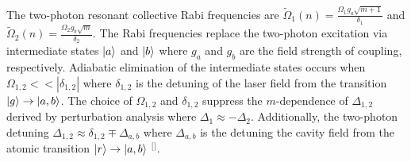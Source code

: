 The two-photon resonant collective Rabi frequencies are $\tilde{\Omega}_{1}(n)=\frac{\Omega_{1}g_{a}\sqrt{m+1}}{\delta_{1}}$ and $\tilde{\Omega}_{2}(n)=\frac{\Omega_{2}g_{b}\sqrt{m}}{\delta_{2}}$. The Rabi frequencies replace the two-photon excitation via intermediate states $\lvert a\rangle$ and $\lvert b\rangle$ where $g_{a}$ and $g_{b}$ are the field strength of coupling, respectively. Adiabatic elimination of the intermediate states occurs when $\Omega_{1,2}<<\left | \delta_{1,2}\right |$ where $\delta_{1,2}$ is the detuning of the laser field from the transition $\lvert g\rangle\rightarrow\lvert a,b\rangle$. The choice of $\Omega_{1,2}$ and $\delta_{1,2}$ suppress the $m$-dependence of $\Delta_{1,2}$ derived by perturbation analysis where $\Delta_{1} \approx -\Delta_{2}$. Additionally, the two-photon detuning $\Delta_{1,2}\approx \delta_{1,2}\mp \Delta_{a,b}$ where $\Delta_{a,b}$ is the detuning the cavity field from the atomic transition $\lvert r\rangle\rightarrow \lvert a,b\rangle$ $^{[}$\citep{Sarkany2015Long-rangeCavity}$^{]}$. 


